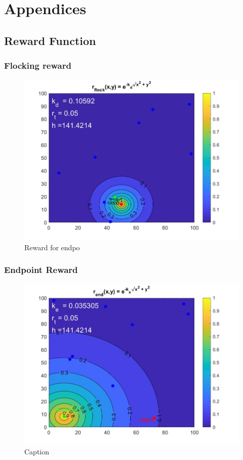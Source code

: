 \section{Appendices}

\subsection{Reward Function}
\subsubsection{Flocking reward}
\begin{figure}[h]
    \centering
    \includegraphics[width=0.7\linewidth]{figures/DroneByItself.jpg}
    \caption{Reward for endpo}
    \label{fig:my_label}
\end{figure}


\subsubsection{Endpoint Reward}
\begin{figure}[h]
    \centering
    \includegraphics[width=0.7\linewidth]{figures/EndByitself.jpg}
    \caption{Caption}
    \label{fig:my_label}
\end{figure}
\clearpage

